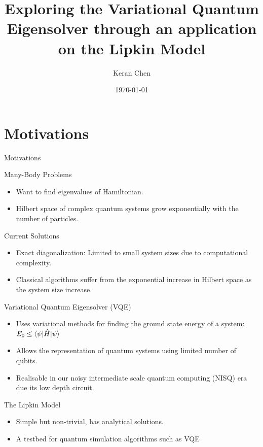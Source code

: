 \documentclass{beamer}
\title{Exploring the Variational Quantum Eigensolver through an application on the Lipkin Model}
\author{Keran Chen}
\institute{University of Oslo}
\date{\today}
\begin{document}
\begin{frame}
  \titlepage
\end{frame}


\section{Motivations}
\begin{frame}{Motivations}
  \begin{block}{Many-Body Problems}
  \begin{itemize}
	\item Want to find eigenvalues of Hamiltonian.
	\item Hilbert space of complex quantum systems grow exponentially with the number of particles.   
  \end{itemize}
  \end{block}

\begin{block}{Current Solutions}
\begin{itemize}
    \item Exact diagonalization: Limited to small system sizes due to computational complexity.
    \item Classical algorithms suffer from the exponential increase in Hilbert space as the system size increase.
  \end{itemize}
\end{block}
\end{frame}

\begin{frame}[t]
\begin{block}{Variational Quantum Eigensolver (VQE)}
\begin{itemize}
	\item Uses variational methods for finding the ground state energy of a system: $ E_0 \leq \braket{\psi|\hat H|\psi}$
	\item Allows the representation of quantum systems using limited number of qubits.
	\item Realisable in our noisy intermediate scale quantum computing (NISQ) era due its low depth circuit.
\end{itemize}	
\end{block}

\begin{block}{The Lipkin Model}
	\begin{itemize}
		\item Simple but non-trivial, has analytical solutions.
		\item A testbed for quantum simulation algorithms such as VQE
	\end{itemize}	
\end{block}
	
\end{frame}
\end{document}

